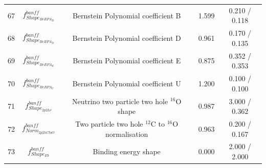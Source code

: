 \begin{tabular} { | c | c | c | c | c |  }
67 & $f_{Shape_{BeRPA_{B}}}^{banff}$ & Bernstein Polynomial coefficient B & 1.599 & 0.210 / 0.118\\ 
68 & $f_{Shape_{BeRPA_{D}}}^{banff}$ & Bernstein Polynomial coefficient D & 0.961 & 0.170 / 0.135\\ 
69 & $f_{Shape_{BeRPA_{E}}}^{banff}$ & Bernstein Polynomial coefficient E & 0.875 & 0.352 / 0.353\\ 
70 & $f_{Shape_{BeRPA_{U}}}^{banff}$ & Bernstein Polynomial coefficient U & 1.200 & 0.100 / 0.100\\ 
71 & $f_{Shape_{2p2h\nu}}^{banff}$ & Neutrino two particle two hole $^{16}$O shape & 0.987 & 3.000 / 0.362\\ 
72 & $f_{Norm_{2p2h C to O}}^{banff}$ & Two particle two hole $^{12}$C to $^{16}$O normalisation & 0.963 & 0.200 / 0.167\\ 
73 & $f_{Shape_{Eb}}^{banff}$ & Binding energy shape & 0.000 & 2.000 / 2.000\\ 

\hline

\end{tabular}